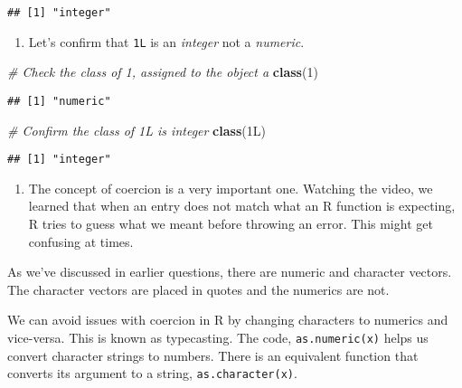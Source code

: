 \documentclass[
]{article}
\newenvironment{Shaded}{\begin{snugshade}}{\end{snugshade}}
\newcommand{\CommentTok}[1]{\textcolor[rgb]{0.56,0.35,0.01}{\textit{#1}}}
\newcommand{\DecValTok}[1]{\textcolor[rgb]{0.00,0.00,0.81}{#1}}
\newcommand{\KeywordTok}[1]{\textcolor[rgb]{0.13,0.29,0.53}{\textbf{#1}}}
\newcommand{\NormalTok}[1]{#1}
\providecommand{\tightlist}{%
  \setlength{\itemsep}{0pt}\setlength{\parskip}{0pt}}
\begin{document}
\begin{verbatim}
## [1] "integer"
\end{verbatim}

\begin{enumerate}
\def\labelenumi{\arabic{enumi}.}
\setcounter{enumi}{10}
\tightlist
\item
  Let's confirm that \texttt{1L} is an \emph{integer} not a
  \emph{numeric}.
\end{enumerate}

\begin{Shaded}
\begin{Highlighting}[]
\CommentTok{# Check the class of 1, assigned to the object a}
\KeywordTok{class}\NormalTok{(}\DecValTok{1}\NormalTok{)}
\end{Highlighting}
\end{Shaded}

\begin{verbatim}
## [1] "numeric"
\end{verbatim}

\begin{Shaded}
\begin{Highlighting}[]
\CommentTok{# Confirm the class of 1L is integer}
\KeywordTok{class}\NormalTok{(1L)}
\end{Highlighting}
\end{Shaded}

\begin{verbatim}
## [1] "integer"
\end{verbatim}

\begin{enumerate}
\def\labelenumi{\arabic{enumi}.}
\setcounter{enumi}{11}
\tightlist
\item
  The concept of coercion is a very important one. Watching the video,
  we learned that when an entry does not match what an R function is
  expecting, R tries to guess what we meant before throwing an error.
  This might get confusing at times.
\end{enumerate}

As we've discussed in earlier questions, there are numeric and character
vectors. The character vectors are placed in quotes and the numerics are
not.

We can avoid issues with coercion in R by changing characters to
numerics and vice-versa. This is known as typecasting. The code,
\texttt{as.numeric(x)} helps us convert character strings to numbers.
There is an equivalent function that converts its argument to a string,
\texttt{as.character(x)}.
\end{document}
